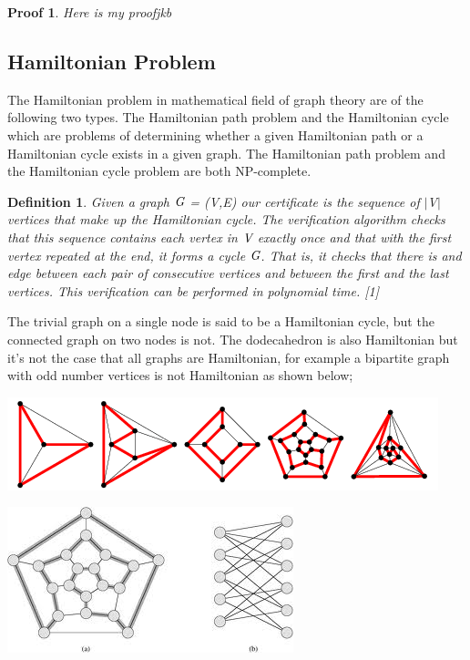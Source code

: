 \documentclass[a4paper]{report}
\newtheorem{defi}{Definition}
\newtheorem{myproof}{Proof}
\begin{document}
\vspace{3mm}



\begin{myproof}
Here is my proofjkb  
\end{myproof}

\subsection{Hamiltonian Problem}
The Hamiltonian problem in mathematical field of graph theory are of the following two types. The Hamiltonian path problem and the Hamiltonian cycle which are problems of determining whether a given Hamiltonian path or a Hamiltonian cycle exists in a given graph. The Hamiltonian path problem and the Hamiltonian cycle problem are both NP-complete. 


\begin{defi}
Given a graph $\emph{G}$ = (V,E) our certificate is the sequence of $\vert$V$\vert$ vertices that make up the Hamiltonian cycle. The verification algorithm checks that this sequence contains each vertex in $\emph{V}$ exactly once and that with the first vertex repeated at the end, it forms a cycle $\emph{G}$. That is, it checks that there is and edge between each pair of consecutive vertices and between the first and the last vertices. This verification can be performed in polynomial time. [1]
\end{defi}

\vspace{3mm}

The trivial graph on a single node is said to be a Hamiltonian cycle, but the connected graph on two nodes is not. The dodecahedron is also Hamiltonian but it's not the case that all graphs are Hamiltonian, for example a bipartite graph with odd number vertices is not Hamiltonian as shown below; 


\begin{center}
\includegraphics[scale=0.80]{Hamiltonian1.png}
\end{center}

\begin{center}
\includegraphics[scale=0.75]{bipartite.png}
\end{center}
\end{document}
